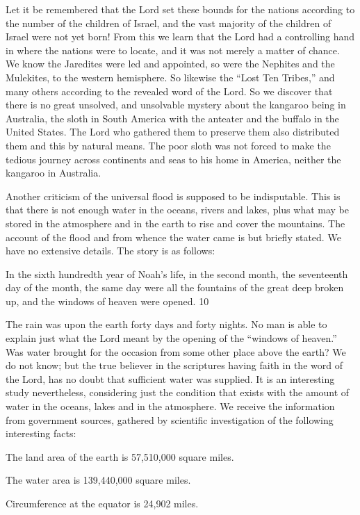 Let it be remembered that the Lord set these bounds for the nations according to the number
of the children of Israel, and the vast majority of the children of Israel were not yet born!
From this we learn that the Lord had a controlling hand in where the nations were to locate,
and it was not merely a matter of chance. We know the Jaredites were led and appointed, so
were the Nephites and the Mulekites, to the western hemisphere. So likewise the ``Lost Ten
Tribes,'' and many others according to the revealed word of the Lord. So we discover that
there is no great unsolved, and unsolvable mystery about the kangaroo being in Australia, the
sloth in South America with the anteater and the buffalo in the United States. The Lord who
gathered them to preserve them also distributed them and this by natural means. The poor
sloth was not forced to make the tedious journey across continents and seas to his home in
America, neither the kangaroo in Australia.

Another criticism of the universal flood is supposed to be indisputable. This is that there is
not enough water in the oceans, rivers and lakes, plus what may be stored in the atmosphere
and in the earth to rise and cover the mountains. The account of the flood and from whence
the water came is but briefly stated. We have no extensive details. The story is as follows:

In the sixth hundredth year of Noah's life, in the second month, the seventeenth day of the
month, the same day were all the fountains of the great deep broken up, and the windows of
heaven were opened. 10

The rain was upon the earth forty days and forty nights. No man is able to explain just what
the Lord meant by the opening of the ``windows of heaven.'' Was water brought for the
occasion from some other place above the earth? We do not know; but the true believer in the
scriptures having faith in the word of the Lord, has no doubt that sufficient water was
supplied. It is an interesting study nevertheless, considering just the condition that exists with
the amount of water in the oceans, lakes and in the atmosphere. We receive the information
from government sources, gathered by scientific investigation of the following interesting
facts:

The land area of the earth is 57,510,000 square miles.

The water area is 139,440,000 square miles.

Circumference at the equator is 24,902 miles.


